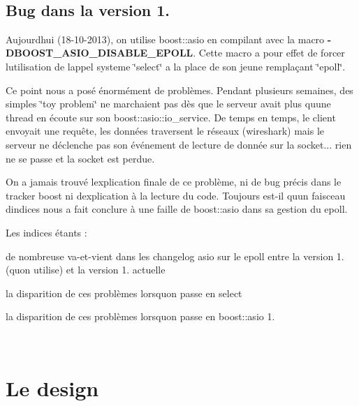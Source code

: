~\newline
 \hypertarget{index_ssec_boost_bug}{}\subsection{Bug dans la version 1.}\label{index_ssec_boost_bug}
Aujourd\textquotesingle{}hui (18-\/10-\/2013), on utilise boost\+::asio en compilant avec la macro {\bfseries -\/\+D\+B\+O\+O\+S\+T\+\_\+\+A\+S\+I\+O\+\_\+\+D\+I\+S\+A\+B\+L\+E\+\_\+\+E\+P\+O\+LL}. Cette macro a pour effet de forcer l\textquotesingle{}utilisation de l\textquotesingle{}appel systeme \char`\"{}select\char`\"{} a la place de son jeune remplaçant \char`\"{}epoll\char`\"{}.

Ce point nous a posé énormément de problèmes. Pendant plusieurs semaines, des simples \char`\"{}toy problem\char`\"{} ne marchaient pas dès que le serveur avait plus qu\textquotesingle{}une thread en écoute sur son boost\+::asio\+::io\+\_\+service. De temps en temps, le client envoyait une requête, les données traversent le réseaux (wireshark) mais le serveur ne déclenche pas son événement de lecture de donnée sur la socket... rien ne se passe et la socket est perdue.

On a jamais trouvé l\textquotesingle{}explication finale de ce problème, ni de bug précis dans le tracker boost ni d\textquotesingle{}explication à la lecture du code. Toujours est-\/il qu\textquotesingle{}un faisceau d\textquotesingle{}indices nous a fait conclure à une faille de boost\+::asio dans sa gestion du epoll.

Les indices étants \+:
\begin{DoxyItemize}
\item de nombreuse va-\/et-\/vient dans les changelog asio sur le epoll entre la version 1. (qu\textquotesingle{}on utilise) et la version 1. actuelle
\item la disparition de ces problèmes lorsqu\textquotesingle{}on passe en select
\item la disparition de ces problèmes lorsqu\textquotesingle{}on passe en boost\+::asio 1.
\end{DoxyItemize}

~\newline


 \hypertarget{index_sec_design}{}\section{Le design}\label{index_sec_design}




